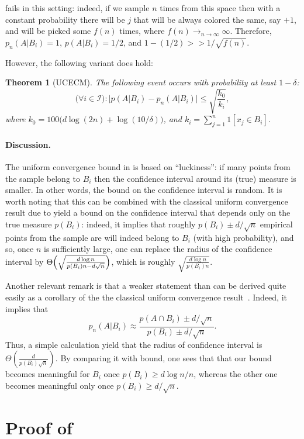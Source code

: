 \documentclass{article}
\newtheorem{theorem}{Theorem}[section]
\newcommand{\I}{\mathcal{I}}
\begin{document}
 fails in this setting:
indeed, if we sample $n$ times from this space 
then with a constant probability there will be  $j$
that will be always colored the same,  say $+1$, 
and will be picked some $f(n)$ times, where $f(n)\to_{n\to\infty}\infty$.
Therefore, $p_n(A\vert B_i) = 1$, $p(A\vert B_i)=1/2$,
and $1-(1/2)>> 1/\sqrt{f(n)}$.

However, the following variant does hold:
\begin{theorem}[UCECM]\label{thm:UCECM}
The following event occurs with probability at least $1-\delta$:
\[\bigl(\forall i\in\I\bigr):\bigl\lvert p(A \vert B_i) - p_n(A \vert B_i) \bigr\rvert \leq 
\sqrt{\frac{k_0}{k_i}},\]
where $k_0 =100\bigl(d\log(2n) + \log(10/\delta)\bigr)$, and $k_i = \sum_{j=1}^n 1[x_j\in B_i]$.
\end{theorem}

\paragraph{Discussion.}
The uniform convergence bound in  is based on ``luckiness'':
if many points from the sample belong to $B_i$ then the confidence interval
around its (true) measure is smaller. 
In other words, the bound on the confidence interval is random.
It is worth noting that this can be combined with the classical uniform convergence
result due \cite{vapnik} to yield a bound on the confidence interval
that depends only on the true measure $p(B_i)$:
indeed, it implies that roughly $p(B_i)\pm d/\sqrt{n}$ 
empirical points from the sample are will indeed belong to $B_i$
(with high probability), and so, once $n$ is sufficiently large,
one can replace the radius of the confidence interval by $\Theta\Bigl(\sqrt{\frac{d\log n}{p(B_i)n - d\sqrt{n}}}\Bigr)$, which is roughly $\sqrt{\frac{d\log n}{p(B_i)n}}$.

Another relevant remark is that a weaker statement than 
can be derived quite easily as a corollary of the the classical uniform convergence
result~\cite{vapnik}. 
Indeed, it implies that 
\[p_n(A\vert B_i)\approx\frac{p(A\cap B_i) \pm d/\sqrt{n}}{p(B_i)\pm d/\sqrt{n}}.\]
Thus, a simple calculation yield that the radius of confidence interval is $\Theta(\frac{d}{p(B_i)\sqrt{n}})$.
By comparing it with bound, one sees that that our bound becomes meaningful for $B_i$
once $p(B_i) \geq d\log n /n$, whereas the other one becomes meaningful
only once $p(B_i)\geq d/\sqrt{n}$.


\section{Proof of }
\end{document}
